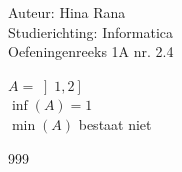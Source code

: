 \documentclass[a4paper]{article}
\begin{document}
\noindent \large Auteur: Hina Rana \\
\noindent \large Studierichting: Informatica\\
\noindent \large Oefeningenreeks 1A nr. 2.4\\

\medskip

\normalsize
$ A = \left ]1,2\right]$ \\

$ \inf(A) = 1 $ \\

$ \min(A)$ bestaat niet


\begin{thebibliography}{999}
\end{thebibliography}
\end{document}
